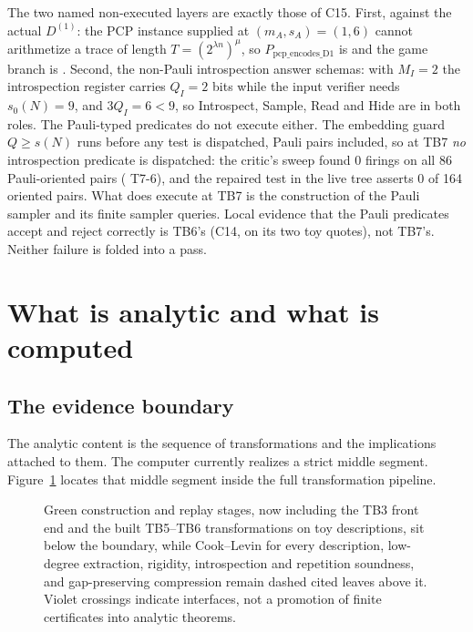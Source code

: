 The two named non-executed layers are exactly those of C15.  First,
 against the actual \(D^{(1)}\): the PCP instance supplied at
\((m_A,s_A)=(1,6)\) cannot arithmetize a trace of length
\(T=(2^{\lambda n})^\mu\), so \(P_{\mathrm{pcp\_encodes\_D1}}\) is 
and the game branch is .  Second, the non-Pauli
introspection answer schemas: with \(M_I=2\) the introspection register carries
\(Q_I=2\) bits while the input verifier needs \(s_0(N)=9\), and
\(3Q_I=6<9\), so Introspect, Sample, Read and Hide are  in both
roles.  The Pauli-typed predicates do not execute either.  The embedding guard
\(Q\geq s(N)\) runs before any test is dispatched, Pauli pairs included, so at
TB7 \emph{no} introspection predicate is dispatched: the critic's sweep found
0 firings on all 86 Pauli-oriented pairs ( T7-6), and
the repaired test in the live tree asserts 0 of 164 oriented pairs.  What does execute
at TB7 is the construction of the Pauli sampler and its finite sampler
queries.  Local evidence that the Pauli predicates accept and reject correctly
is TB6's (C14, on its two toy quotes), not TB7's.  Neither failure is folded
into a pass.

\section{What is analytic and what is computed}

\subsection{The evidence boundary}

The analytic content is the sequence of transformations and the implications
attached to them.  The computer currently realizes a strict middle segment.
Figure~\ref{fig:evidence-boundary} locates that middle segment inside the full
transformation pipeline.
\begin{figure}[H]
\centering

\caption{Green construction and replay stages, now including the TB3 front end and the built TB5--TB6 transformations on toy descriptions, sit below the boundary, while Cook--Levin for every description, low-degree extraction, rigidity, introspection and repetition soundness, and gap-preserving compression remain dashed cited leaves above it.  Violet crossings indicate interfaces, not a promotion of finite certificates into analytic theorems.}
\label{fig:evidence-boundary}
\end{figure}

